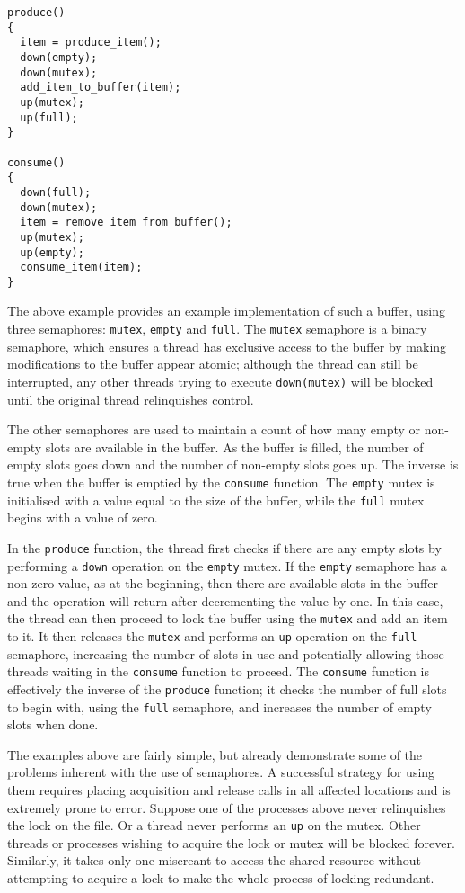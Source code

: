 \begin{verbatim}
produce()
{
  item = produce_item();
  down(empty);
  down(mutex);
  add_item_to_buffer(item);
  up(mutex);
  up(full);
}

consume()
{
  down(full);
  down(mutex);
  item = remove_item_from_buffer();
  up(mutex);
  up(empty);
  consume_item(item);
}
\end{verbatim}

The above example provides an example implementation of such a buffer,
using three semaphores: \texttt{mutex}, \texttt{empty} and
\texttt{full}.  The \texttt{mutex} semaphore is a binary semaphore,
which ensures a thread has exclusive access to the buffer by making
modifications to the buffer appear atomic; although the thread can
still be interrupted, any other threads trying to execute
\texttt{down(mutex)} will be blocked until the original thread
relinquishes control.

The other semaphores are used to maintain a count of how many empty or
non-empty slots are available in the buffer.  As the buffer is filled,
the number of empty slots goes down and the number of non-empty slots
goes up.  The inverse is true when the buffer is emptied by the
\texttt{consume} function.  The \texttt{empty} mutex is initialised
with a value equal to the size of the buffer, while the \texttt{full}
mutex begins with a value of zero.

In the \texttt{produce} function, the thread first checks if there are
any empty slots by performing a \texttt{down} operation on the \texttt{empty}
mutex.  If the \texttt{empty} semaphore has a non-zero value, as at
the beginning, then there are available slots in the buffer and the
operation will return after decrementing the value by one.  In this
case, the thread can then proceed to lock the buffer using the
\texttt{mutex} and add an item to it.  It then releases the
\texttt{mutex} and performs an \texttt{up} operation on the \texttt{full}
semaphore, increasing the number of slots in use and potentially
allowing those threads waiting in the \texttt{consume} function to
proceed.  The \texttt{consume} function is effectively the inverse of
the \texttt{produce} function; it checks the number of full slots to
begin with, using the \texttt{full} semaphore, and increases the
number of empty slots when done.

The examples above are fairly simple, but already demonstrate some of
the problems inherent with the use of semaphores.  A successful
strategy for using them requires placing acquisition and release calls
in all affected locations and is extremely prone to error.  Suppose
one of the processes above never relinquishes the lock on the file.
Or a thread never performs an \texttt{up} on the mutex.  Other threads or
processes wishing to acquire the lock or mutex will be blocked
forever.  Similarly, it takes only one miscreant to access the shared
resource without attempting to acquire a lock to make the whole
process of locking redundant.

